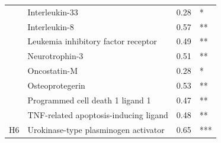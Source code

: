 \begin{table}[ht]
{\begin{tabular}{clll}
                                           & Interleukin-33                                                                        & 0.28                               & *                                       \\
                                           & Interleukin-8                                                                         & 0.57                               & **                                      \\
                                           & Leukemia inhibitory factor receptor                                                   & 0.49                               & **                                      \\
                                           & Neurotrophin-3                                                                        & 0.51                               & **                                      \\
                                           & \cellcolor[HTML]{EFEFEF}Oncostatin-M                                                  & \cellcolor[HTML]{EFEFEF}0.28       & \cellcolor[HTML]{EFEFEF}*               \\
                                           & \cellcolor[HTML]{EFEFEF}Osteoprotegerin                                               & \cellcolor[HTML]{EFEFEF}0.53       & \cellcolor[HTML]{EFEFEF}**              \\
                                           & \cellcolor[HTML]{EFEFEF}Programmed cell death 1 ligand 1                              & \cellcolor[HTML]{EFEFEF}0.47       & \cellcolor[HTML]{EFEFEF}**              \\
                                           & \cellcolor[HTML]{EFEFEF}TNF-related apoptosis-inducing ligand                         & \cellcolor[HTML]{EFEFEF}0.48       & \cellcolor[HTML]{EFEFEF}**              \\
\multirow{-23}{*}{H6}                      & Urokinase-type plasminogen activator                                                  & 0.65                               & ***                                    
\end{tabular}
}

\label{table:Result1MalesRegression}
\end{table}


